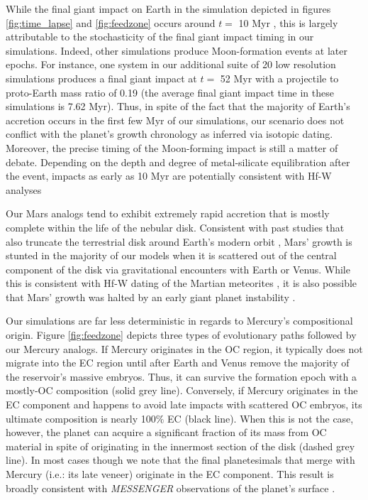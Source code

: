 \documentclass[trackchanges,twocolumn]{aastex}
\begin{document}
While the final giant impact on Earth in the simulation depicted in figures \ref{fig:time_lapse} and \ref{fig:feedzone} occurs around $t=$ 10 Myr \citep[much quicker than the $\sim$30-60 Myr timing of the Moon-forming impact as inferred from Hf-W chronology:][]{kleine09}, this is largely attributable to the stochasticity of the final giant impact timing in our simulations.  Indeed, other simulations produce Moon-formation events at later epochs.  For instance, one system in our additional suite of 20 low resolution simulations produces a final giant impact at $t=$ 52 Myr with a projectile to proto-Earth mass ratio of 0.19 (the average final giant impact time in these simulations is 7.62 Myr).  Thus, in spite of the fact that the majority of Earth's accretion occurs in the first few Myr of our simulations, our scenario does not conflict with the planet's growth chronology as inferred via isotopic dating.  Moreover, the precise timing of the Moon-forming impact is still a matter of debate.  Depending on the depth and degree of metal-silicate equilibration after the event, impacts as early as 10 Myr are potentially consistent with Hf-W analyses \citep{fischer17}

Our Mars analogs tend to exhibit extremely rapid accretion that is mostly complete within the life of the nebular disk.  Consistent with past studies that also truncate the terrestrial disk around Earth's modern orbit \citep{hansen09,walsh11}, Mars' growth is stunted in the majority of our models when it is scattered out of the central component of the disk via gravitational encounters with Earth or Venus.  While this is consistent with Hf-W dating of the Martian meteorites \citep{Dauphas11}, it is also possible that Mars' growth was halted by an early giant planet instability \citep{clement18}.

Our simulations are far less deterministic in regards to Mercury's compositional origin.  Figure \ref{fig:feedzone} depicts three types of evolutionary paths followed by our Mercury analogs.  If Mercury originates in the OC region, it typically does not migrate into the EC region until after Earth and Venus remove the majority of the reservoir's massive embryos.  Thus, it can survive the formation epoch with a mostly-OC composition (solid grey line).  Conversely, if Mercury originates in the EC component and happens to avoid late impacts with scattered OC embryos, its ultimate composition is nearly 100$\%$ EC (black line).  When this is not the case, however, the planet can acquire a significant fraction of its mass from OC material in spite of originating in the innermost section of the disk (dashed grey line).  In most cases though we note that the final planetesimals that merge with Mercury (i.e.: its late veneer) originate in the EC component.  This result is broadly consistent with \textit{MESSENGER} observations of the planet's surface \citep{nittler11}.
\end{document}
